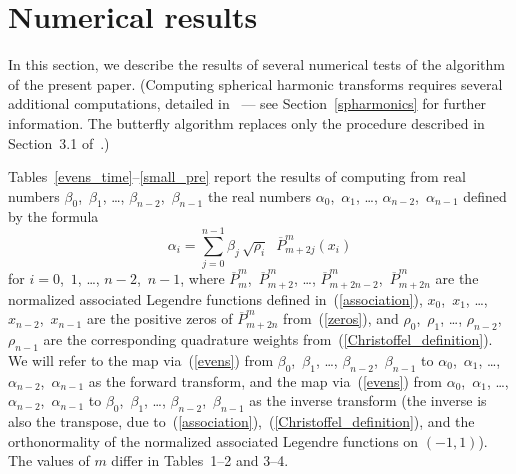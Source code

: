 \documentclass[final,3p,times]{elsarticle}
\begin{document}
\section{Numerical results}
\label{numerical}

In this section, we describe the results of several numerical tests
of the algorithm of the present paper.
(Computing spherical harmonic transforms requires
several additional computations, detailed in~\cite{tygert_sph}
--- see Section~\ref{spharmonics} for further information.
The butterfly algorithm replaces only the procedure described
in Section~3.1 of~\cite{tygert_sph}.)

Tables~\ref{evens_time}--\ref{small_pre}
report the results of computing from real numbers
$\beta_0$,~$\beta_1$, \dots, $\beta_{n-2}$,~$\beta_{n-1}$
the real numbers $\alpha_0$,~$\alpha_1$, \dots, $\alpha_{n-2}$,~$\alpha_{n-1}$
defined by the formula
\begin{equation}
\label{evens}
\alpha_i = \sum_{j=0}^{n-1} \beta_j \, \sqrt{\rho_i} \;\;
           \overline{P}^m_{m+2j}(x_i)
\end{equation}
for $i = 0$,~$1$, \dots, $n-2$,~$n-1$,
where $\overline{P}^m_m$,~$\overline{P}^m_{m+2}$, \dots,
$\overline{P}^m_{m+2n-2}$,~$\overline{P}^m_{m+2n}$
are the normalized associated Legendre functions defined
in~(\ref{association}),
$x_0$,~$x_1$, \dots, $x_{n-2}$,~$x_{n-1}$ are the positive zeros
of $\overline{P}^m_{m+2n}$ from~(\ref{zeros}),
and $\rho_0$,~$\rho_1$, \dots, $\rho_{n-2}$,~$\rho_{n-1}$
are the corresponding quadrature weights from~(\ref{Christoffel_definition}).
We will refer to the map via~(\ref{evens})
from $\beta_0$,~$\beta_1$, \dots, $\beta_{n-2}$,~$\beta_{n-1}$
to $\alpha_0$,~$\alpha_1$, \dots, $\alpha_{n-2}$,~$\alpha_{n-1}$
as the forward transform, and the map via~(\ref{evens})
from $\alpha_0$,~$\alpha_1$, \dots, $\alpha_{n-2}$,~$\alpha_{n-1}$
to $\beta_0$,~$\beta_1$, \dots, $\beta_{n-2}$,~$\beta_{n-1}$
as the inverse transform (the inverse is also the transpose,
due to~(\ref{association}),~(\ref{Christoffel_definition}),
and the orthonormality of the normalized associated Legendre functions
on $(-1,1)$).
The values of $m$ differ in Tables~1--2 and 3--4.
\end{document}

